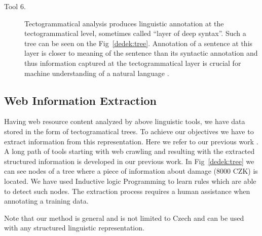 \begin{multicols}{2}
\begin{description}
	\item[Tool 6.] Tectogrammatical analysis produces linguistic annotation
at the tectogrammatical level, sometimes called
``layer of deep syntax''. Such a tree can be seen on
the Fig~\ref{dedek:tree}. Annotation of a sentence at this layer
is closer to meaning of the sentence than its syntactic
annotation and thus information captured at the tectogrammatical
layer is crucial for machine understanding
of a natural language \cite{dedek:KlTransformationBasedTectogrammatical2006}.
\end{description}

\subsection{Web Information Extraction}

Having web resource content analyzed by above linguistic tools, we have data stored in the form of tectogramatical trees. To achieve our objectives we have to extract information from this representation. 
Here we refer to our previous work \cite{dedek:DeVoLinguisticextraction2008,dedek:DeVoComputingaggregations2008,dedek:DeEcExperimentswith2008}. A long path of tools starting with web crawling and resulting with the extracted structured information is developed in our previous work. 
In Fig~\ref{dedek:tree} we can see nodes of a tree where a piece of information about damage (8000 CZK) is located. We have used Inductive logic Programming to learn rules which are able to detect such nodes. 
The extraction process requires a human assistance when annotating a training data.

Note that our method is general and is not limited to Czech and can be used with any structured linguistic representation. 



\end{multicols}
